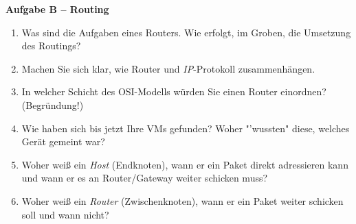 \documentclass[paper=a4,fontsize=11pt]{scrartcl}%
\numberwithin{equation}{section}
\begin{document}
\begin{center}\Large{\textbf{Aufgabe B -- Routing}}\end{center}

\begin{enumerate}
	\item Was sind die Aufgaben eines Routers. Wie erfolgt, im Groben, die Umsetzung des Routings?
	\item Machen Sie sich klar, wie Router und \emph{IP}-Protokoll zusammenhängen.
	\item In welcher Schicht des OSI-Modells würden Sie einen Router einordnen? (Begründung!)
	\item Wie haben sich bis jetzt Ihre VMs gefunden? Woher "'wussten" diese, welches Gerät gemeint war?
	\item Woher weiß ein \textit{Host} (Endknoten), wann er ein Paket direkt adressieren kann und wann er es an Router/Gateway weiter schicken muss?
	\item Woher weiß ein \textit{Router} (Zwischenknoten), wann er ein Paket weiter schicken soll und wann nicht?
\end{enumerate}
\end{document}
